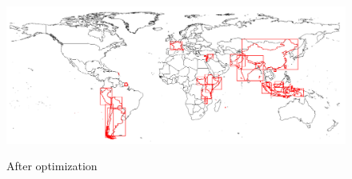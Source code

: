 \documentclass[utf8]{article}
\begin{document}
\begin{large}
  \begin{figure}[h]
    \caption{After optimization}\label{Figure 2}
    \includegraphics[width=\textwidth]{afterOpti.png}\label{fig:afteropti}
  \end{figure}


\end{large}
\end{document}
